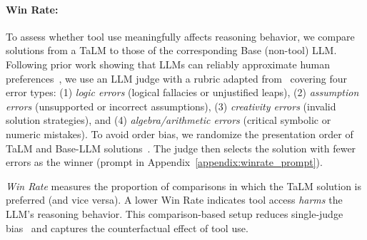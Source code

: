 \documentclass[11pt]{article}
\begin{document}
\paragraph{Win Rate:}
\label{sec:win_rate}
To assess whether tool use meaningfully affects reasoning behavior, we compare solutions from a TaLM to those of the corresponding Base (non-tool) LLM. Following prior work showing that LLMs can reliably approximate human preferences~\citep{10.5555/3666122.3668142, chen2025learningreasonfactuality}, we use an LLM judge with a rubric adapted from~\citet{petrov2025proofbluffevaluatingllms} covering four error types: (1) \textit{logic errors} (logical fallacies or unjustified leaps), (2) \textit{assumption errors} (unsupported or incorrect assumptions), (3) \textit{creativity errors} (invalid solution strategies), and (4) \textit{algebra/arithmetic errors} (critical symbolic or numeric mistakes). 
To avoid order bias, we randomize the presentation order of TaLM and Base-LLM solutions~\citep{shi2025judgingjudgessystematicstudy}.
The judge then selects the solution with fewer errors as the winner (prompt in Appendix~\ref{appendix:winrate_prompt}).


\textit{Win Rate} measures the proportion of comparisons in which the TaLM solution is preferred (and vice versa). A lower Win Rate indicates tool access \emph{harms} the LLM's reasoning behavior. This comparison-based setup reduces single-judge bias~\citep{liu-etal-2025-verifact, fatahi-bayat-etal-2025-factbench} and captures the counterfactual effect of tool use.
\end{document}
